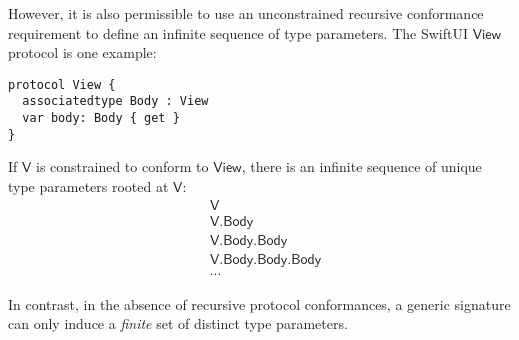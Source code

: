 \documentclass[headsepline,bibliography=totoc]{scrreport}
\newcommand{\namesym}[1]{\mathsf{#1}}
\newcommand{\genericparam}[1]{\bm{\mathsf{#1}}}
\newcommand{\proto}[1]{\bm{\mathsf{#1}}}
\theoremstyle{definition}
\theoremstyle{definition}
\theoremstyle{definition}
\begin{document}
However, it is also permissible to use an unconstrained recursive conformance requirement to define an infinite sequence of type parameters. The SwiftUI $\proto{View}$ protocol is one example:
\begin{Verbatim}
protocol View {
  associatedtype Body : View
  var body: Body { get }
}
\end{Verbatim}
If $\genericparam{V}$ is constrained to conform to $\proto{View}$, there is an infinite sequence of unique type parameters rooted at $\genericparam{V}$:
\begin{align*}
&\genericparam{V}\\
&\genericparam{V}.\namesym{Body}\\
&\genericparam{V}.\namesym{Body}.\namesym{Body}\\
&\genericparam{V}.\namesym{Body}.\namesym{Body}.\namesym{Body}\\
&\cdots
\end{align*}

In contrast, in the absence of recursive protocol conformances, a generic signature can only induce a \emph{finite} set of distinct type parameters.
\end{document}
